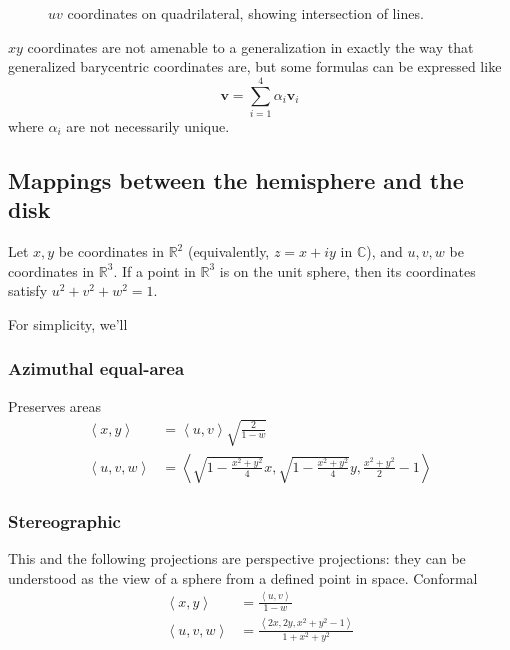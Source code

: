 \documentclass{amsart}[12pt]
\begin{document}
\begin{figure}%
\caption{$uv$ coordinates on quadrilateral, showing intersection of lines.}
\label{fig:uv}
\end{figure}

$xy$ coordinates are not amenable to a generalization in exactly the way that
generalized barycentric coordinates are, but some formulas can be expressed like
\begin{equation}
  \mathbf v = \sum^4_{i=1} \alpha_i \mathbf v_i
\end{equation}
where $\alpha_i$ are not necessarily unique.

\subsection{Mappings between the hemisphere and the disk}
Let $x,y$ be coordinates in $\mathbb{R}^2$ (equivalently, $z = x + i y$ in
$\mathbb{C}$), and $u,v,w$ be coordinates in $\mathbb{R}^3$.
If a point in $\mathbb{R}^3$ is on the unit sphere,
then its coordinates satisfy $u^2 + v^2 + w^2 = 1$.

For simplicity, we'll \cite{snyder}

\subsubsection{Azimuthal equal-area}
Preserves areas
\begin{equation}\begin{split}
  \left<x, y\right> &= \left<u, v\right> \sqrt{\frac{2}{1-w}} \\
  \left<u, v, w\right> &= \left<\sqrt{1- \frac{x^2+y^2}{4}}x,
    \sqrt{1- \frac{x^2+y^2}{4}}y, \frac{x^2+y^2}{2}-1\right>
\end{split}\end{equation}

\subsubsection{Stereographic}
This and the following projections are perspective projections: they can be
understood as the view of a sphere from a defined point in space.
Conformal
\begin{equation}\begin{split}
  \left<x, y\right> &= \frac{\left<u, v\right>}{1-w} \\
  \left<u, v, w\right> &= \frac{\left<2x, 2y, x^2+y^2-1\right>}{1+x^2+y^2}
\end{split}\end{equation}
\end{document}

